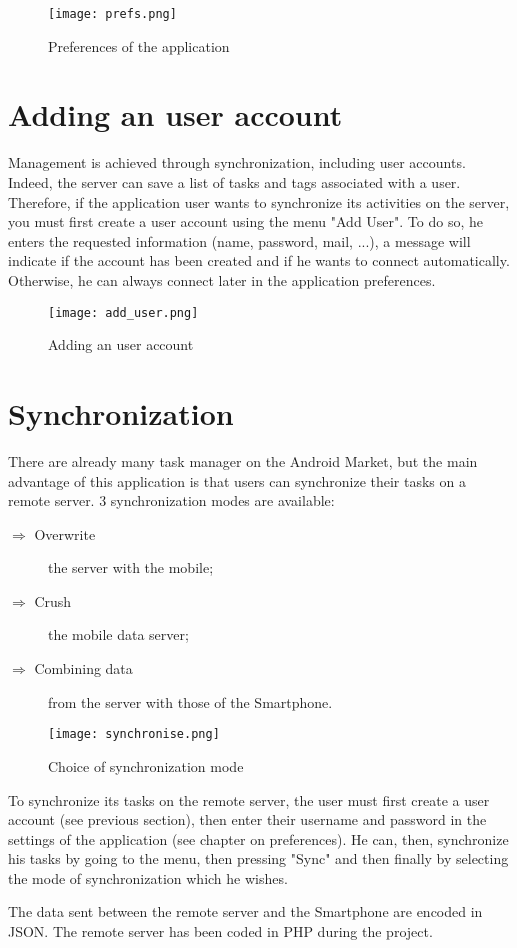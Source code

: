 \begin{figure}[!ht]
    \centering
    \texttt{[image: prefs.png]}
    \caption{Preferences of the application}
\end{figure}

\section{Adding an user account}

Management is achieved through synchronization, including user accounts. Indeed, the server can save a list of tasks and tags associated with a user. Therefore, if the application user wants to synchronize its activities on the server, you must first create a user account using the menu "Add User".
To do so, he enters the requested information (name, password, mail, ...), a message will indicate if the account has been created and if he wants to connect automatically. Otherwise, he can always connect later in the application preferences.

\begin{figure}[!ht]
    \centering
    \texttt{[image: add\_user.png]}
    \caption{Adding an user account}
\end{figure}

\section{Synchronization}

There are already many task manager on the Android Market, but the main advantage of this application is that users can synchronize their tasks on a remote server.
3 synchronization modes are available:
\begin{description}
    \item[$\Rightarrow$ Overwrite] the server with the mobile;
    \item[$\Rightarrow$ Crush] the mobile data server;
    \item[$\Rightarrow$ Combining data] from the server with those of the Smartphone.
\end{description}

\begin{figure}[!ht]
    \centering
    \texttt{[image: synchronise.png]}
    \caption{Choice of synchronization mode}
\end{figure}

\noindent To synchronize its tasks on the remote server, the user must first create a user account (see previous section), then enter their username and password in the settings of the application (see chapter on preferences). He can, then, synchronize his tasks by going to the menu, then pressing "Sync" and then finally by selecting the mode of synchronization which he wishes.

\noindent The data sent between the remote server and the Smartphone are encoded in JSON. The remote server has been coded in PHP during the project.

\clearpage
